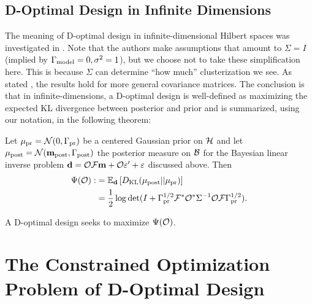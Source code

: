 \documentclass{amsart}
\numberwithin{equation}{section}
\begin{document}
\subsection{D-Optimal Design in Infinite Dimensions}\label{subsec:D optimal design} 
The meaning of D-optimal design in infinite-dimensional Hilbert spaces
was investigated in \cite{AlexanderianGloorGhattas14}. Note that the
authors make assumptions that amount to $\Sigma=I$ (implied by
$\Gamma_{\textup{model}} = 0,\sigma^2=1$), but we choose not to take these
simplification here. This is because $\Sigma$ can determine ``how
much'' clusterization we see. As stated
\cite[pp. 681]{AlexanderianGloorGhattas14}, the results hold for more
general covariance matrices. The conclusion is that in
infinite-dimensions, a D-optimal design is well-defined as maximizing
the expected KL divergence between posterior and prior and is summarized, using our notation,
in the following theorem:
\begin{theorem}
  Let $\mu_{\textup{pr}} = \mathcal{N}(0,\Gamma_{\textup{pr}})$ be a centered Gaussian prior
  on $\mathcal{H}$   and let $\mu_{\textup{post}} = \mathcal{N}(\mathbf{m}_{\textup{post}},\Gamma_{\textup{post}})$ 
  the posterior measure on $\mathcal{B}$ for the Bayesian linear
  inverse problem $\mathbf{d} =  \mathcal{O} \mathcal{F}\mathbf{m} + \mathcal{O} \varepsilon' + \varepsilon$ discussed
  above. Then 
  \begin{align}\label{eq:objective}
    \begin{split}
      \Psi( \mathcal{O}) :&= \mathbb{E}_{\mathbf{d}}\left [ D_{\text{KL}} (\mu_{\textup{post}} || \mu_{\textup{pr}} ) \right ] \\
      &= \frac12 \log \det 
      ( I + \Gamma_{\textup{pr}}^{1/2}  \mathcal{F} ^* \mathcal{O}^* \Sigma^{-1} \mathcal{O} \mathcal{F} \Gamma_{\textup{pr}}^{1/2}).
    \end{split}
  \end{align}
\end{theorem}
A D-optimal design seeks to maximize $\Psi(\mathcal{O})$.

\section{The Constrained Optimization Problem of D-Optimal Design}\label{section:D and grad}
\end{document}
